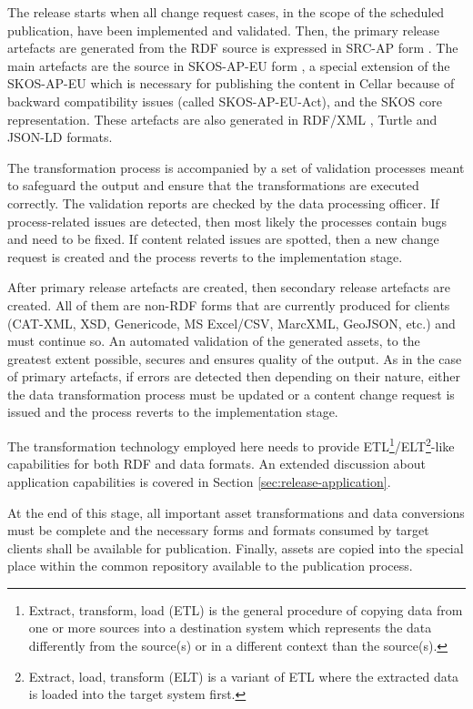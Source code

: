 	The release starts when all change request cases, in the scope of the scheduled publication, have been implemented and validated. Then, the primary release artefacts are generated from the RDF source is expressed in SRC-AP form \citep{src-ap-vb3}. The main artefacts are the source in SKOS-AP-EU form \citep{skos-ap-eu}, a special extension of the SKOS-AP-EU which is necessary for publishing the content in Cellar because of backward compatibility issues (called SKOS-AP-EU-Act), and the SKOS core \citep{skos-spec} representation. These artefacts are also generated in RDF/XML \citep{rdf-xml-Schreiber:14:RXS,rdf-xml-Beckett:04:RSS}, Turtle \citep{turtle-Carothers:14:RT} and JSON-LD \citep{sporny2014json,spornyjson} formats. 
	
	The transformation process is accompanied by a set of validation processes meant to safeguard the output and ensure that the transformations are executed correctly. The validation reports are checked by the data processing officer. If process-related issues are detected, then most likely the processes contain bugs and need to be fixed. If content related issues are spotted, then a new change request is created and the process reverts to the implementation stage. 
	
	After primary release artefacts are created, then secondary release artefacts are created. All of them are non-RDF forms that are currently produced for clients (CAT-XML, XSD, Genericode, MS Excel/CSV, MarcXML, GeoJSON, etc.) and must continue so. An automated validation of the generated assets, to the greatest extent possible, secures and ensures quality of the output. As in the case of primary artefacts, if errors are detected then depending on their nature, either the data transformation process must be updated or a content change request is issued and the process reverts to the implementation stage. 
	
	The transformation technology employed here needs to provide ETL\footnote{Extract, transform, load (ETL) is the general procedure of copying data from one or more sources into a destination system which represents the data differently from the source(s) or in a different context than the source(s).}/ELT\footnote{Extract, load, transform (ELT) is a variant of ETL where the extracted data is loaded into the target system first.}-like capabilities for both RDF and data formats. An extended discussion about application capabilities is covered in Section \ref{sec:release-application}.
	
	At the end of this stage, all important asset transformations and data conversions must be complete and the necessary forms and formats consumed by target clients shall be available for publication. Finally, assets are copied into the special place within the common repository available to the publication process. 
	
